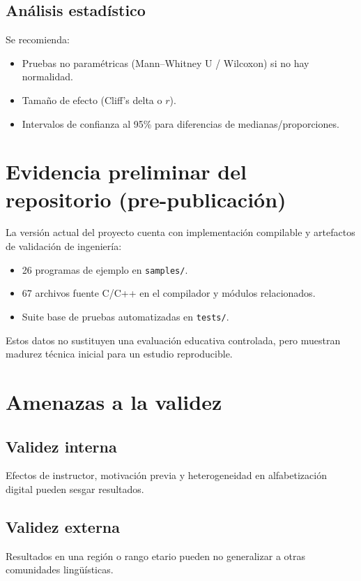 \documentclass[11pt,a4paper]{article}
\begin{document}
\subsection{An\'alisis estad\'istico}
Se recomienda:
\begin{itemize}[leftmargin=*,itemsep=2pt]
  \item Pruebas no param\'etricas (Mann--Whitney U / Wilcoxon) si no hay normalidad.
  \item Tama\~no de efecto (Cliff's delta o \(r\)).
  \item Intervalos de confianza al 95\% para diferencias de medianas/proporciones.
\end{itemize}

\section{Evidencia preliminar del repositorio (pre-publicaci\'on)}
La versi\'on actual del proyecto cuenta con implementaci\'on compilable y artefactos de validaci\'on de ingenier\'ia:
\begin{itemize}[leftmargin=*,itemsep=2pt]
  \item 26 programas de ejemplo en \texttt{samples/}.
  \item 67 archivos fuente C/C++ en el compilador y m\'odulos relacionados.
  \item Suite base de pruebas automatizadas en \texttt{tests/}.
\end{itemize}

Estos datos no sustituyen una evaluaci\'on educativa controlada, pero muestran madurez t\'ecnica inicial para un estudio reproducible.

\section{Amenazas a la validez}
\subsection{Validez interna}
Efectos de instructor, motivaci\'on previa y heterogeneidad en alfabetizaci\'on digital pueden sesgar resultados.

\subsection{Validez externa}
Resultados en una regi\'on o rango etario pueden no generalizar a otras comunidades ling\"u\'isticas.
\end{document}
